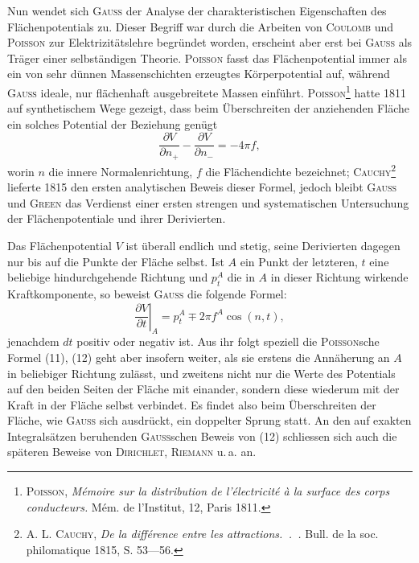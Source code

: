 Nun wendet sich \textsc{Gauss} der Analyse der charakteristischen Eigenschaften
des Flächenpotentials zu. Dieser Begriff war durch die Arbeiten von \textsc{Coulomb}
und \textsc{Poisson} zur Elektrizitätslehre begründet worden, erscheint aber erst
bei \textsc{Gauss} als Träger einer selbständigen Theorie. \textsc{Poisson} fasst das Flächenpotential
immer als ein von sehr dünnen Massenschichten erzeugtes Körperpotential
auf, während \textsc{Gauss} ideale, nur flächenhaft ausgebreitete Massen
einführt. \textsc{Poisson}\footnote{\textsc{Poisson}, \textit{Mémoire sur la distribution de l’électricité à la surface des corps conducteurs.} Mém.
de l’Institut, 12, Paris 1811.} hatte 1811 auf synthetischem Wege gezeigt, dass beim
Überschreiten der anziehenden Fläche ein solches Potential der Beziehung
genügt
\[
\frac{\partial V}{\partial n_+}-\frac{\partial V}{\partial n_-}=-4\pi f,\tag{11}
\]
\noindent worin \(n\) die innere Normalenrichtung, \(f\) die Flächendichte bezeichnet; \textsc{Cauchy}\footnote{\textsc{A. L. Cauchy}, \textit{De la différence entre les attractions.\, .\, .} Bull. de la soc. philomatique 1815,
S. 53—56.}
\clearpage{}
\noindent lieferte 1815 den ersten analytischen Beweis dieser Formel, jedoch bleibt
\textsc{Gauss} und \textsc{Green} das Verdienst einer ersten strengen und systematischen
Untersuchung der Flächenpotentiale und ihrer Derivierten.

Das Flächenpotential \(V\) ist überall endlich und stetig, seine Derivierten
dagegen nur bis auf die Punkte der Fläche selbst. Ist \(A\) ein Punkt der
letzteren, \(t\) eine beliebige hindurchgehende Richtung und \(p_t^A\) die in \(A\) in dieser
Richtung wirkende Kraftkomponente, so beweist \textsc{Gauss} die folgende Formel:
\[
\left.\frac{\partial V}{\partial t}\right|_A=p_t^A\mp2\pi f^A\cos(n,t),\tag{12}
\]
\noindent jenachdem \(dt\) positiv oder negativ ist. Aus ihr folgt speziell die \textsc{Poisson}sche
Formel (11), (12) geht aber insofern weiter, als sie erstens die Annäherung an
\(A\) in beliebiger Richtung zulässt, und zweitens nicht nur die Werte des Potentials
auf den beiden Seiten der Fläche mit einander, sondern diese wiederum
mit der Kraft in der Fläche selbst verbindet. Es findet also beim Überschreiten
der Fläche, wie \textsc{Gauss} sich ausdrückt, ein doppelter Sprung statt.
An den auf exakten Integralsätzen beruhenden \textsc{Gauss}schen Beweis von (12)
schliessen sich auch die späteren Beweise von \textsc{Dirichlet}, \textsc{Riemann} u.\,a. an.

